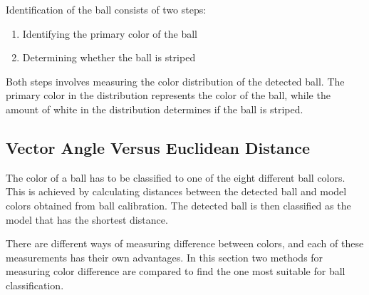 Identification of the ball consists of two steps:
\begin{enumerate}
  \item Identifying the primary color of the ball
  \item Determining whether the ball is striped
\end{enumerate}
Both steps involves measuring the color distribution of the detected ball. The primary color in the distribution represents the color of the ball, while the amount of white in the distribution determines if the ball is striped.

\subsection{Vector Angle Versus Euclidean Distance}
The color of a ball has to be classified to one of the eight different ball colors. This is achieved by calculating distances between the detected ball and model colors obtained from ball calibration. The detected ball is then classified as the model that has the shortest distance.

There are different ways of measuring difference between colors, and each of these measurements has their own advantages. In this section two methods for measuring color difference are compared to find the one most suitable for ball classification.

